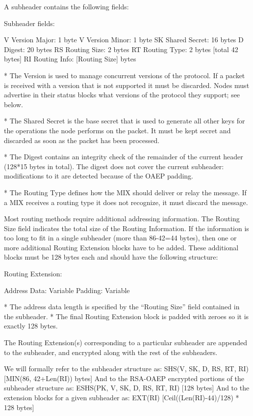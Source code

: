 A subheader contains the following fields:

Subheader fields:

V   Version Major:   1 byte
V   Version Minor:   1 byte
SK  Shared Secret:   16 bytes
D   Digest:          20 bytes
RS  Routing Size:    2 bytes 
RT  Routing Type:    2 bytes [total 42 bytes]
RI  Routing Info:    [Routing Size] bytes

* The Version is used to manage concurrent versions of the
protocol. If a packet is received with a version that is not supported
it must be discarded. Nodes must advertise in their status blocks what
versions of the protocol they support; see below.

* The Shared Secret is the base secret that is used to generate all
other keys for the operations the node performs on the packet. It must be
kept secret and discarded as soon as the packet has been processed. 

* The Digest contains an integrity check of the remainder of the current
header (128*15 bytes in total). The digest does not cover the current
subheader: modifications to it are detected because of the OAEP padding.

* The Routing Type defines how the MIX should deliver or relay the
  message. If a MIX receives a routing type it does not recognize,
  it must discard the message.

  Most routing methods require additional addressing information.
  The Routing Size field indicates the total size of the Routing
  Information. If the information is too long to fit in a single
  subheader (more than 86-42=44 bytes), then one or more additional
  Routing Extension blocks have to be added. These additional blocks
  must be 128 bytes each and should have the following structure:
 
  Routing Extension:

    Address Data:     Variable
    Padding:          Variable

* The address data length is specified by the ``Routing Size'' field
  contained in the subheader.
* The final Routing Extension block is padded with zeroes so it is
  exactly 128 bytes.

The Routing Extension(s) corresponding to a particular subheader are
appended to the subheader, and encrypted along with the rest of the
subheaders.

We will formally refer to the subheader structure as:
SHS(V, SK, D, RS, RT, RI)     [MIN(86, 42+Len(RI)) bytes] 
And to the RSA-OAEP encrypted portions of the subheader structure as:
ESHS(PK, V, SK, D, RS, RT, RI)   [128 bytes]
And to the extension blocks for a given subheader as:
EXT(RI)                       [Ceil((Len(RI)-44)/128) * 128 bytes]

